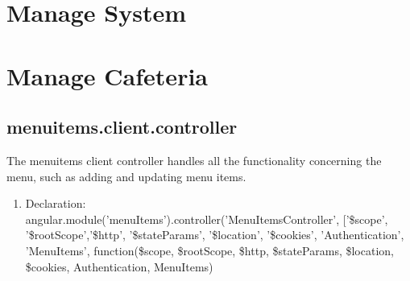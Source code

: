 \documentclass[a4paper,12pt]{article}
\begin{document}
\section{Manage System}
\section{Manage Cafeteria}
\subsection{menuitems.client.controller}
The menuitems client controller handles all the functionality concerning the menu, such as adding and updating menu items.
\begin{enumerate}
\item Declaration: \\angular.module('menuItems').controller('MenuItemsController', ['\$scope', '\$rootScope','\$http', '\$stateParams', '\$location', '\$cookies', 'Authentication', 'MenuItems',
	function(\$scope, \$rootScope, \$http, \$stateParams, \$location, \$cookies, Authentication, MenuItems)
	

\end{enumerate}
\end{document}
